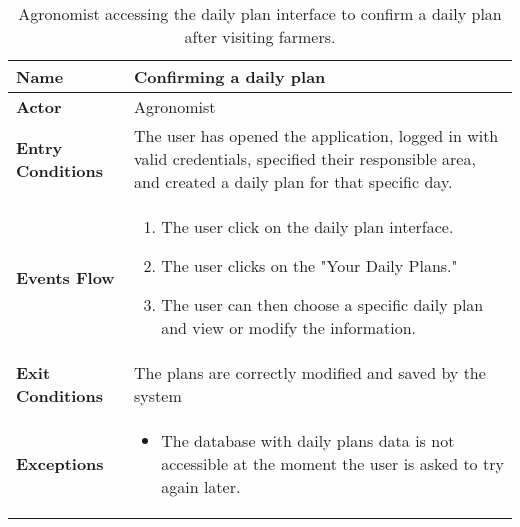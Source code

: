 
\begin{table}[hbt!]
\centering
\small
\caption{\label{tab:agrConfirmPlan}Agronomist accessing the daily plan interface to confirm a daily plan after visiting farmers.}
\renewcommand{\arraystretch}{1.25}

\begin{tabular}{|l|>{\raggedright\arraybackslash}m{12cm}|}

    \hline
    \textbf{Name} & Confirming a daily plan\\
    \hline
   	\textbf{Actor} & Agronomist\\
    \hline
    \textbf{Entry Conditions} & The user has opened the application, logged in with valid credentials, specified their responsible area, and created a daily plan for that specific day.\\
    \hline
    \textbf{Events Flow} & \begin{enumerate}
            \item The user click on the daily plan interface.
            \item The user clicks on the "Your Daily Plans."
            \item The user can then choose a specific daily plan and view or modify the information.
       \end{enumerate}\\
    \hline
    \textbf{Exit Conditions} & The plans are correctly modified and saved by the system\\
    \hline
    \textbf{Exceptions} & 
       \begin{itemize}
          \item The database with daily plans data is not accessible at the moment the user is asked to try again later.
        \end{itemize}
     \\
    \hline
\end{tabular}
\end{table}